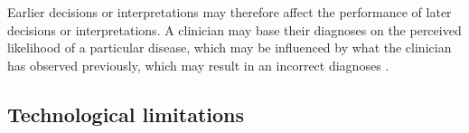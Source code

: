 \documentclass{chi-ext}
\begin{document}
  Earlier decisions or interpretations may therefore affect the performance of later decisions or interpretations. A clinician may base their diagnoses on the perceived likelihood of a particular disease, which may be influenced by what the clinician has observed previously, which may result in an incorrect diagnoses \cite{Croskerry2002}.



  
\subsection{Technological limitations}
\end{document}
